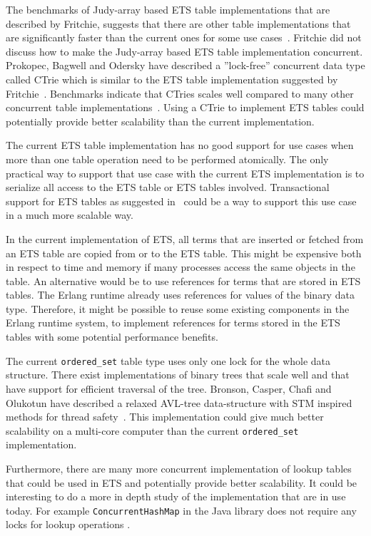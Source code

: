 \documentclass[aps,pre,preprint,nofootinbib]{revtex4}
\begin{document}
  The benchmarks of Judy-array based ETS table implementations that are described by Fritchie, suggests that there are other table implementations that are significantly faster than the current ones for some use cases~\cite{ScottEtsJudy}.
  Fritchie did not discuss how to make the Judy-array based ETS table implementation concurrent.
  Prokopec, Bagwell and Odersky have described a ''lock-free'' concurrent data type called CTrie which is similar to the ETS table implementation suggested by Fritchie~\cite{ProkopecCTrie}.
  Benchmarks indicate that CTries scales well compared to many other concurrent table implementations~\cite{ProkopecCTrie}.
  Using a CTrie to implement ETS tables could potentially provide better scalability than the current implementation.
  
  The current ETS table implementation has no good support for use cases when more than one table operation need to be performed atomically.
  The only practical way to support that use case with the current ETS implementation is to serialize all access to the ETS table or ETS tables involved.
  Transactional support for ETS tables as suggested in~\cite{PatrikErlangTrans} could be a way to support this use case in a much more scalable way.
  
  In the current implementation of ETS, all terms that are inserted or fetched from an ETS table are copied from or to the ETS table.
  This might be expensive both in respect to time and memory if many processes access the same objects in the table.
  An alternative would be to use references for terms that are stored in ETS tables. 
  The Erlang runtime already uses references for values of the binary data type.
  Therefore, it might be possible to reuse some existing components in the Erlang runtime system, to implement references for terms stored in the ETS tables with some potential performance benefits.
  
  The current \verb|ordered_set| table type uses only one lock for the whole data structure. 
  There exist implementations of binary trees that scale well and that have support for efficient traversal of the tree.
  Bronson, Casper, Chafi and Olukotun have described a relaxed AVL-tree data-structure with STM inspired methods for thread safety~\cite{BronsonPracTree}.
  This implementation could give much better scalability on a multi-core computer than the current \verb|ordered_set| implementation.
  
  Furthermore, there are many more concurrent implementation of lookup tables that could be used in ETS and potentially provide better scalability.
  It could be interesting to do a more in depth study of the implementation that are in use today.
  For example \verb|ConcurrentHashMap| in the Java library does not require any locks for lookup operations \cite{BrianConcHashMap}.
  

  


  
\end{document}
